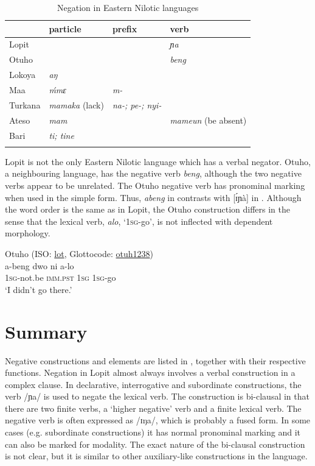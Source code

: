 \documentclass[output=paper,colorlinks,citecolor=brown,draftmode]{langscibook}
\begin{document}
\begin{table}
    \begin{tabularx}{.85\textwidth}{llll}
\lsptoprule
                        & {particle}& {prefix} & {verb} \\
    \midrule
    { Lopit}   &               &              & \textit{ɲa}     \\
    { Otuho}   &               &              & \textit{beng}  \\
    { Lokoya}  & \textit{aŋ}   &              & \\
    { Maa}     & \textit{ḿmɛ}  & \textit{m-}  & \\
    { Turkana} & {\textit{mamaka} (lack)} & \textit{na-; pe-; nyi-}&\\
    { Ateso}   & \textit{mam}  &              & {\textit{mameun} (be absent)}\\
    { Bari}    & \textit{ti; tine} &          &\\
    \lspbottomrule
    \end{tabularx}
\caption{Negation in Eastern Nilotic languages} 
\label{tab:lop:3}
\end{table}


Lopit is not the only Eastern Nilotic language which has a verbal negator. Otuho, a neighbouring language, has the negative verb \textit{beng}, although the two negative verbs appear to be unrelated. The Otuho negative verb has pronominal marking when used in the simple form. Thus, \textit{abeng} in  contrasts with [ɪ́ɲà] in . Although the word order is the same as in Lopit, the Otuho construction differs in the sense that the lexical verb, \textit{alo}, ‘\textsc{1sg-}go’, is not inflected with dependent morphology.

\ea\label{ex:lop:113} Otuho (ISO: \href{https://iso639-3.sil.org/code/lot}{lot}, Glottocode: \href{https://glottolog.org/resource/languoid/id/otuh1238}{otuh1238})  \\ 
        \gll a-beng dwo ni a-lo \\ 
             1\textsc{sg}{}-not.be \textsc{imm.pst} 1\textsc{sg} 1\textsc{sg}{}-go \\
        \glt ‘I didn’t go there.’ \citep[339]{Muratori1938}
\z

\section{Summary}

Negative constructions and elements are listed in , together with their respective functions. Negation in Lopit almost always involves a verbal construction in a complex clause. In declarative, interrogative and subordinate constructions, the verb /ɲa/ is used to negate the lexical verb. The construction is bi-clausal in that there are two finite verbs, a ‘higher negative’ verb and a finite lexical verb. The negative verb is often expressed as /ɪŋa/, which is probably a fused form. In some cases (e.g. subordinate constructions) it has normal pronominal marking and it can also be marked for modality. The exact nature of the bi-clausal construction is not clear, but it is similar to other auxiliary-like constructions in the language.
\end{document}
